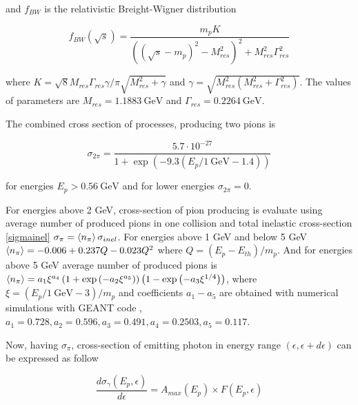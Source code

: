 and $f_{BW}$ is the relativistic Breight-Wigner distribution

\begin{equation}
	f_{BW}\left(\sqrt{s}\right)=\frac{m_p K}{\left(\left(\sqrt{s}-m_p\right)^2-M_{res}^2\right)^2+M_{res}^2\Gamma_{res}^2}
\end{equation}

where $K = \sqrt{8}M_{res}\Gamma_{res}\gamma/\pi\sqrt{M_{res}^2+\gamma}$ and $\gamma = \sqrt{M_{res}^2\left(M_{res}^2+\Gamma_{res}^2\right)}$. The values of parameters are $M_{res} = 1.1883~\text{GeV}$ and $\Gamma_{res} = 0.2264~\text{GeV}$.

The combined cross section of processes, producing two pions is

\begin{equation}
	\sigma_{2\pi}=\frac{5.7\cdot10^{-27}}{1+\exp(-9.3\left(E_p/1~\text{GeV} - 1.4\right))}
\end{equation}

for energies $E_p > 0.56~\text{GeV}$ and for lower energies $\sigma_{2\pi}=0$.

For energies above 2 GeV, cross-section of pion producing is evaluate using average number of produced pions in one collision and total inelastic cross-section \ref{sigmainel} $\sigma_{\pi} = \braket{n_{\pi}} \sigma_{inel}$. For energies above 1 GeV and below 5 GeV $\braket{n_{\pi}} = -0.006 + 0.237 Q - 0.023 Q^2$ where $Q = \left(E_p - E_{th}\right)/m_p$. And for energies above 5 GeV average number of produced pions is $\braket{n_{\pi}} = a_1 \xi^{a_4}\left(1 + \exp\left(-a_2\xi^{a_5}\right)\right)\left(1-\exp\left(-a_3\xi^{1/4}\right)\right)$, where $\xi = \left(E_p/1~\text{GeV} - 3\right)/m_p$ and coefficients $a_1-a_5$ are obtained with numerical simulations with GEANT code \cite{AllisonGeant2006}, $a_1 = 0.728, a_2 = 0.596, a_3 = 0.491, a_4 = 0.2503, a_5 = 0.117$.

Now, having $\sigma_{\pi}$, cross-section of emitting photon in energy range $\left(\epsilon, \epsilon + d\epsilon\right)$ can be expressed as follow

\begin{equation}
	\frac{d\sigma_{\gamma}\left(E_p, \epsilon\right)}{d\epsilon} = A_{max}\left(E_p\right)\times F\left(E_p, \epsilon\right)
\end{equation}

